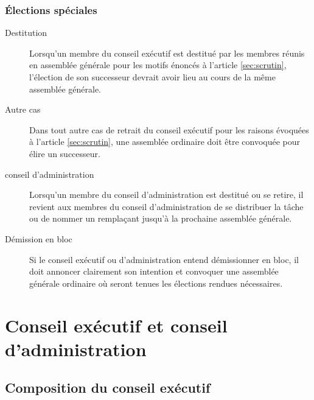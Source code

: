 \documentclass{aediroum}
\newcommand{\article}[1]{article \ref{#1}}
\begin{document}
\subsubsection{Élections spéciales}\label{sec:elections-speciales}

  \begin{description}
  \item[Destitution] Lorsqu'un membre du conseil exécutif est destitué par les membres réunis en assemblée générale pour les motifs énoncés à l'\article{sec:scrutin}, l'élection de son successeur devrait avoir lieu au cours de la même assemblée générale.
  \item[Autre cas] Dans tout autre cas de retrait du conseil exécutif pour les raisons évoquées à l'\article{sec:scrutin}, une assemblée ordinaire doit être convoquée pour élire un successeur.
  \item[conseil d'administration] Lorsqu'un membre du conseil d'administration est destitué ou se retire, il revient aux membres du conseil d'administration de se distribuer la tâche ou de nommer un remplaçant jusqu'à la prochaine assemblée générale.
  \item[Démission en bloc] Si le conseil exécutif ou d'administration entend démissionner en bloc, il doit annoncer clairement son intention et convoquer une assemblée générale ordinaire où seront tenues les élections rendues nécessaires.
  \end{description}


\section{Conseil exécutif et conseil d'administration}\label{sec:conseil-executif-et-conseil-dadministration}
\subsection{Composition du conseil exécutif}\label{sec:composition-du-conseil-executif}
\end{document}
